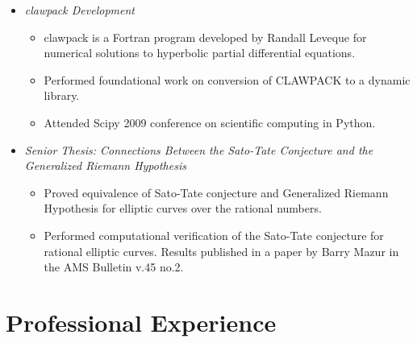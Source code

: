 \documentclass{article}
\begin{document}
\begin{itemize}
{    Functions}
    \begin{itemize}
      \item Studied the Chebfun system developed by Lloyd Trefethen et. al. and
        implemented core functionality in Python using the Numpy/Scipy Python
        libraries.
      \item Collaborated with Trefethen on porting Chebfun to an open-source
        license.
    \end{itemize}
  \item {\it {\sc clawpack} Development}
    \begin{itemize}
      \item {\sc clawpack} is a Fortran program developed by Randall Leveque for
        numerical solutions to hyperbolic partial differential equations.
      \item Performed foundational work on conversion of CLAWPACK to a dynamic
        library.
      \item Attended Scipy 2009 conference on scientific computing in Python.
    \end{itemize}
  \item {\it Senior Thesis: Connections Between the Sato-Tate Conjecture
    and the Generalized Riemann Hypothesis}
    \begin{itemize}
      \item Proved equivalence of Sato-Tate conjecture and Generalized Riemann
        Hypothesis for elliptic curves over the rational numbers.
      \item Performed computational verification of the Sato-Tate conjecture for
        rational elliptic curves. Results published in a paper by Barry Mazur in
        the AMS Bulletin v.45 no.2.
    \end{itemize}

\end{itemize}



\section*{Professional Experience}
\end{document}

